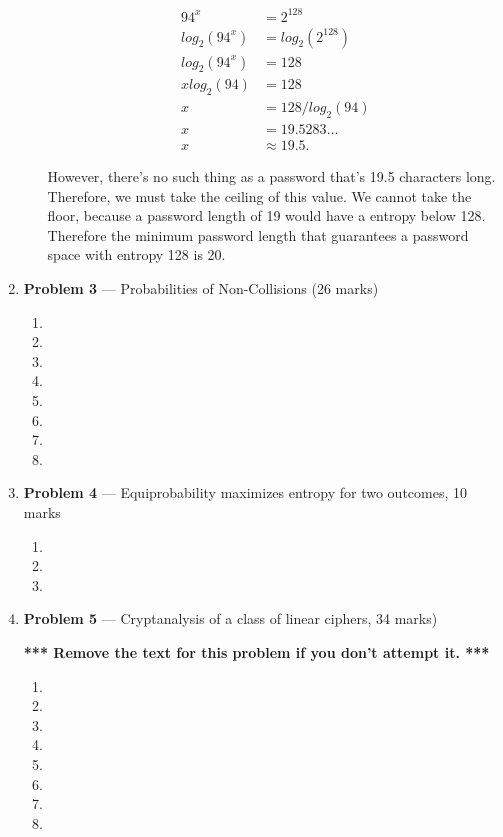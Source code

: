 \documentclass[11pt]{article}
\theoremstyle{definition}
\begin{document}
\begin{enumerate}
\begin{enumerate}
\begin{align*}
94^x &= 2^{128}\\
log_2(94^x) &= log_2(2^{128})\\
log_2(94^x) &= 128\\
x log_2(94) &= 128\\
x &= 128 / log_2(94)\\
x &=  19.5283 \ldots \\
x&\approx 19.5.
\end{align*}

However, there's no such thing as a password that's 19.5 characters long. Therefore, we must take the ceiling of this value. We cannot take the floor, because a password length
of 19 would have a entropy below 128. Therefore the minimum password length that guarantees a password space with entropy 128 is 20.

\end{enumerate}

\newpage

\item[] \textbf{Problem 3} --- Probabilities of Non-Collisions (26 marks)

\begin{enumerate}
\item
\item
\item
\item
\item
\item
\item
\item
\end{enumerate}

\newpage

\item[] \textbf{Problem 4} --- Equiprobability maximizes entropy for two outcomes, 10 marks
\begin{enumerate}
\item

\item
\item
\end{enumerate}

\newpage

\item[] \textbf{Problem 5} --- Cryptanalysis of a class of linear ciphers, 34 marks)

\textbf{*** Remove the text for this problem if you don't attempt it. ***}

\begin{enumerate}
\item
\item
\item
\item
\item
\item
\item
\item
\end{enumerate}


\end{enumerate}
\end{document}
